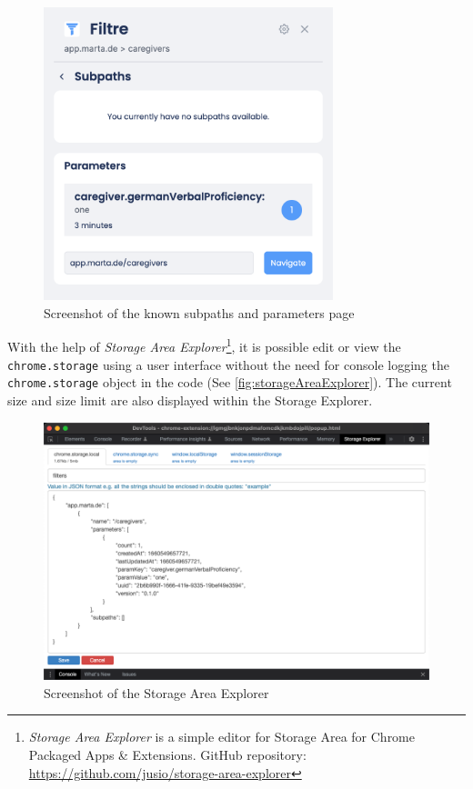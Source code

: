 \begin{figure}[H]
  \centering
  \includegraphics[width=0.75\textwidth]{assets/Filtre_parameters.png}
  \caption{Screenshot of the known subpaths and parameters page}
  \label{fig:filtreParameters}
\end{figure}

With the help of \emph{Storage Area Explorer}\footnote{\emph{Storage Area Explorer} is a simple editor for Storage Area for Chrome Packaged Apps \& Extensions. GitHub repository: \url{https://github.com/jusio/storage-area-explorer}}, it is possible edit or view the \texttt{chrome.storage} using a user interface without the need for console logging the \texttt{chrome.storage} object in the code (See \autoref{fig:storageAreaExplorer}). The current size and size limit are also displayed within the Storage Explorer.

\begin{figure}[H]
  \includegraphics[width=\textwidth]{assets/Storage_area_explorer.png}
  \caption{Screenshot of the Storage Area Explorer}
  \label{fig:storageAreaExplorer}
\end{figure}

